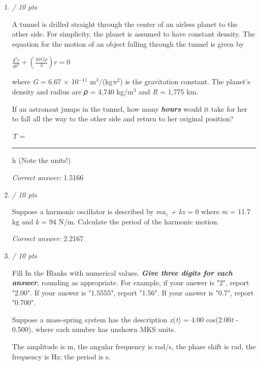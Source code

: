 \documentclass[11pt]{article}
\begin{document}
\begin{enumerate}[leftmargin=*,label=\textbf{Question \arabic*.}]
\item \hfill \textit{/ 10 pts}

A tunnel is drilled straight through the center of an airless planet to the other side. For simplicity, the planet is assumed to have constant density. The equation for the motion of an object falling through the tunnel is given by

$\frac{d^2r}{dt^2}+\left(\frac{4\pi G\rho}{3}\right)r=0$


where \emph{G} = 6.67 × 10$^{-11}$ m$^{3}$/(kgᐧ݀s$^{2}$) is the gravitation constant. The planet's density and radius are 𝜌 = 4,740 kg/m$^{3}$ and \emph{R} = 1,775 km.

If an astronaut jumps in the tunnel, how many \textbf{\emph{hours}} would it take for her to fall all the way to the other side and return to her original position?



\emph{T} = \rule{2cm}{0.4pt} h (Note the units!)

\textit{Correct answer: } 1.5166

\item \hfill \textit{/ 10 pts}

Suppose a harmonic oscillator is described by \emph{ma$_{z}$ + kz} = 0 where \emph{m} = 11.7 kg and \emph{k} = 94 N/m. Calculate the period of the harmonic motion.

\textit{Correct answer: } 2.2167

\item \hfill \textit{/ 10 pts}

Fill In the Blanks with numerical values. \emph{\textbf{Give three digits for each answer}}, rounding as appropriate. For example, if your answer is "2", report "2.00". If your answer is "1.5555", report "1.56". If your answer is "0.7", report "0.700".



Suppose a mass-spring system has the description \emph{x}(\emph{t}) = 4.00 cos(2.00\emph{t} - 0.500), where each number has unshown MKS units.



The amplitude is
 m, the angular frequency is
 rad/s, the phase shift is
 rad, the frequency is
 Hz; the period is
 s.


\end{enumerate}
\end{document}
